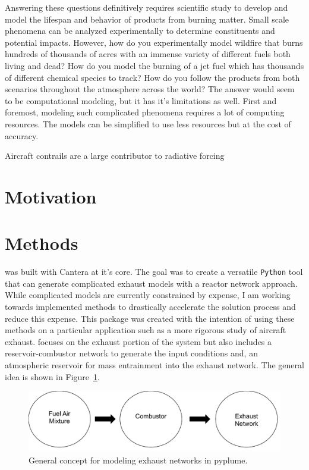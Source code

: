 \documentclass[smallextended,referee]{svjour3}
\begin{document}
Answering these questions definitively requires scientific study to develop and model the lifespan and behavior of products from burning matter. Small scale phenomena can be analyzed experimentally to determine constituents and potential impacts. However, how do you experimentally model wildfire that burns hundreds of thousands of acres with an immense variety of different fuels both living and dead? How do you model the burning of a jet fuel which has thousands of different chemical species to track? How do you follow the products from both scenarios throughout the atmosphere across the world? The answer would seem to be computational modeling, but it has it's limitations as well. First and foremost, modeling such complicated phenomena requires a lot of computing resources. The models can be simplified to use less resources but at the cost of accuracy.

Aircraft contrails are a large contributor to radiative forcing

\section{Motivation}


\section{Methods}

\pyplume{} was built with Cantera\cite{cantera} at it's core. The goal was to create a versatile \texttt{Python} tool that can generate complicated exhaust models with a reactor network approach. While complicated models are currently constrained by expense, I am working towards implemented methods to drastically accelerate the solution process and reduce this expense. This package was created with the intention of using these methods on a particular application such as a more rigorous study of aircraft exhaust. \pyplume{} focuses on the exhaust portion of the system but also includes a reservoir-combustor network to generate the input conditions and, an atmospheric reservoir for mass entrainment into the exhaust network. The general idea is shown in Figure~\ref{fig:general}.

\begin{figure}[htb!]
    \centering
    \includegraphics[scale=\SCALE]{examples/report/figures/general.pdf}

    \caption{General concept for modeling exhaust networks in pyplume.}
    \label{fig:general}
\end{figure}
\end{document}
